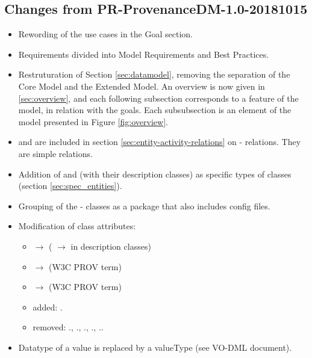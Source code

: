 
\subsection{Changes from PR-ProvenanceDM-1.0-20181015}

\begin{itemize}
\item Rewording of the use cases in the Goal section.
\item Requirements divided into Model Requirements and Best Practices.
\item Restruturation of Section \ref{sec:datamodel}, removing the separation of the Core Model and the Extended Model. An overview is now given in \ref{sec:overview}, and each following subsection corresponds to a feature of the model, in relation with the goals. Each subsubsection is an element of the model presented in Figure \ref{fig:overview}.
\item {} and  are included in section \ref{sec:entity-activity-relations} on - relations. They are simple relations.
\item Addition of  and  (with their description classes) as specific types of  classes (section \ref{sec:spec_entities}).
\item Grouping of the - classes as a  package that also includes config files.
\item Modification of class attributes: 
\begin{itemize}
  \item {} $\rightarrow$  ( $\rightarrow$  in description classes)
  \item {} $\rightarrow$  (W3C PROV term)
  \item {} $\rightarrow$  (W3C PROV term)
  \item added: .
  \item removed: ., ., ., ., ..
\end{itemize}
\item Datatype of a value is replaced by a valueType (see VO-DML document).

\end{itemize}
